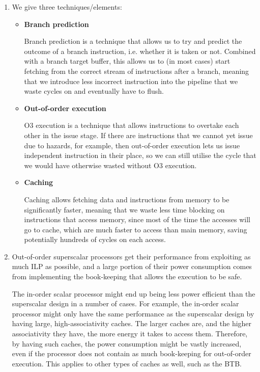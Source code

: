 


\begin{enumerate}[label=(\alph*)]
  \item

    We give three techniques/elements:

    \begin{itemize}
      \item
        \textbf{Branch prediction}

        Branch prediction is a technique that allows us to try and predict the outcome of a branch instruction, i.e. whether it is taken or not. Combined with a branch target buffer, this allows us to (in most cases) start fetching from the correct stream of instructions after a branch, meaning that we introduce less incorrect instruction into the pipeline that we waste cycles on and eventually have to flush.

      \item
        \textbf{Out-of-order execution}

        O3 execution is a technique that allows instructions to overtake each other in the issue stage. If there are instructions that we cannot yet issue due to hazards, for example, then out-of-order execution lets us issue independent instruction in their place, so we can still utilise the cycle that we would have otherwise wasted without O3 execution.

      \item
        \textbf{Caching}

        Caching allows fetching data and instructions from memory to be significantly faster, meaning that we waste less time blocking on instructions that access memory, since most of the time the accesses will go to cache, which are much faster to access than main memory, saving potentially hundreds of cycles on each access.
    \end{itemize}

  \item
    Out-of-order superscalar processors get their performance from exploiting as much ILP as possible, and a large portion of their power consumption comes from implementing the book-keeping that allows the execution to be safe.

    The in-order scalar processor might end up being less power efficient than the superscalar design in a number of cases. For example, the in-order scalar processor might only have the same performance as the superscalar design by having large, high-associativity caches. The larger caches are, and the higher associativity they have, the more energy it takes to access them. Therefore, by having such caches, the power consumption might be vastly increased, even if the processor does not contain as much book-keeping for out-of-order execution. This applies to other types of caches as well, such as the BTB.


\end{enumerate}

